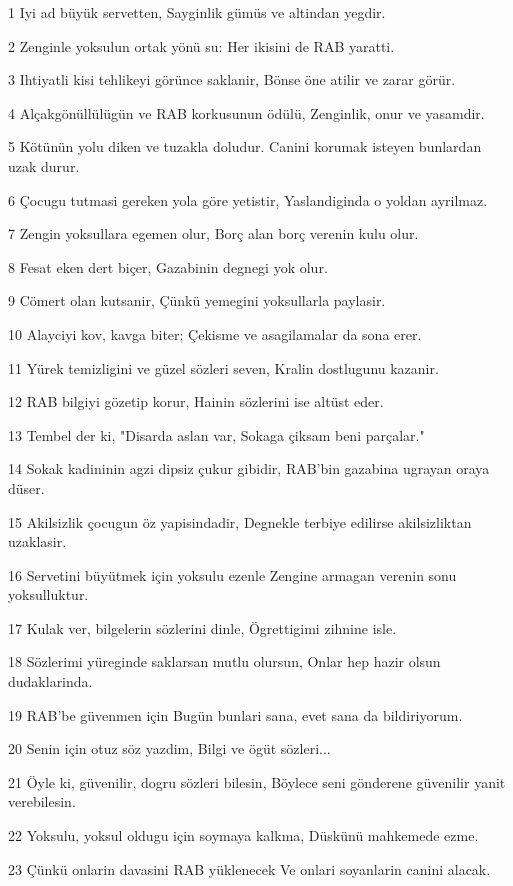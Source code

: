 \par 1 Iyi ad büyük servetten, Sayginlik gümüs ve altindan yegdir.
\par 2 Zenginle yoksulun ortak yönü su: Her ikisini de RAB yaratti.
\par 3 Ihtiyatli kisi tehlikeyi görünce saklanir, Bönse öne atilir ve zarar görür.
\par 4 Alçakgönüllülügün ve RAB korkusunun ödülü, Zenginlik, onur ve yasamdir.
\par 5 Kötünün yolu diken ve tuzakla doludur. Canini korumak isteyen bunlardan uzak durur.
\par 6 Çocugu tutmasi gereken yola göre yetistir, Yaslandiginda o yoldan ayrilmaz.
\par 7 Zengin yoksullara egemen olur, Borç alan borç verenin kulu olur.
\par 8 Fesat eken dert biçer, Gazabinin degnegi yok olur.
\par 9 Cömert olan kutsanir, Çünkü yemegini yoksullarla paylasir.
\par 10 Alayciyi kov, kavga biter; Çekisme ve asagilamalar da sona erer.
\par 11 Yürek temizligini ve güzel sözleri seven, Kralin dostlugunu kazanir.
\par 12 RAB bilgiyi gözetip korur, Hainin sözlerini ise altüst eder.
\par 13 Tembel der ki, "Disarda aslan var, Sokaga çiksam beni parçalar."
\par 14 Sokak kadininin agzi dipsiz çukur gibidir, RAB'bin gazabina ugrayan oraya düser.
\par 15 Akilsizlik çocugun öz yapisindadir, Degnekle terbiye edilirse akilsizliktan uzaklasir.
\par 16 Servetini büyütmek için yoksulu ezenle Zengine armagan verenin sonu yoksulluktur.
\par 17 Kulak ver, bilgelerin sözlerini dinle, Ögrettigimi zihnine isle.
\par 18 Sözlerimi yüreginde saklarsan mutlu olursun, Onlar hep hazir olsun dudaklarinda.
\par 19 RAB'be güvenmen için Bugün bunlari sana, evet sana da bildiriyorum.
\par 20 Senin için otuz söz yazdim, Bilgi ve ögüt sözleri...
\par 21 Öyle ki, güvenilir, dogru sözleri bilesin, Böylece seni gönderene güvenilir yanit verebilesin.
\par 22 Yoksulu, yoksul oldugu için soymaya kalkma, Düskünü mahkemede ezme.
\par 23 Çünkü onlarin davasini RAB yüklenecek Ve onlari soyanlarin canini alacak.
